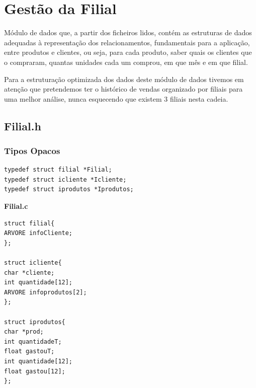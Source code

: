 \section{Gestão da Filial}


Módulo de dados que, a partir dos ficheiros lidos, contém as estruturas de dados adequadas à representação dos relacionamentos, fundamentais para a aplicação, entre produtos e clientes, ou seja, para cada produto, saber quais os clientes que o compraram, quantas unidades cada um comprou, em que mês e em que filial.

 Para a estruturação optimizada dos dados deste módulo de dados tivemos em atenção que pretendemos ter o histórico de vendas organizado por filiais para uma melhor análise, nunca esquecendo que existem 3 filiais nesta cadeia. 

\subsection{Filial.h}

\subsubsection{Tipos Opacos}
\begin{Verbatim}
typedef struct filial *Filial;
typedef struct icliente *Icliente;
typedef struct iprodutos *Iprodutos;
\end{Verbatim}

\textbf{Filial.c}
\begin{verbatim}
struct filial{
ARVORE infoCliente;
};

struct icliente{
char *cliente;
int quantidade[12];
ARVORE infoprodutos[2];
};

struct iprodutos{
char *prod;
int quantidadeT;
float gastouT;
int quantidade[12];
float gastou[12];
};
\end{verbatim}

\subsubsection{}

